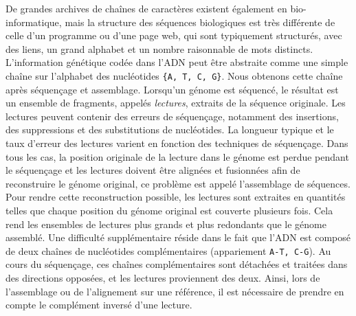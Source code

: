 De grandes archives de chaînes de caractères existent également en bio-informatique, mais la structure des séquences biologiques est très différente de celle d'un programme ou d'une page web, qui sont typiquement structurés, avec des liens, un grand alphabet et un nombre raisonnable de mots distincts.
L'information génétique codée dans l'ADN peut être abstraite comme une simple chaîne sur l'alphabet des nucléotides \texttt{\{A, T, C, G\}}.
Nous obtenons cette chaîne après séquençage et assemblage. Lorsqu'un génome est séquencé, le résultat est un ensemble de fragments, appelés \emph{lectures}, extraits de la séquence originale. Les lectures peuvent contenir des erreurs de séquençage, notamment des insertions, des suppressions et des substitutions de nucléotides. La longueur typique et le taux d'erreur des lectures varient en fonction des techniques de séquençage.
%
Dans tous les cas, la position originale de la lecture dans le génome est perdue pendant le séquençage et les lectures doivent être alignées et fusionnées afin de reconstruire le génome original, ce problème est appelé l'assemblage de séquences. Pour rendre cette reconstruction possible, les lectures sont extraites en quantités telles que chaque position du génome original est couverte plusieurs fois. Cela rend les ensembles de lectures plus grands et plus redondants que le génome assemblé. 
Une difficulté supplémentaire réside dans le fait que l'ADN est composé de deux chaînes de nucléotides complémentaires (appariement \texttt{A-T, C-G}). Au cours du séquençage, ces chaînes complémentaires sont détachées et traitées dans des directions opposées, et les lectures proviennent des deux. Ainsi, lors de l'assemblage ou de l'alignement sur une référence, il est nécessaire de prendre en compte le complément inversé d'une lecture.


